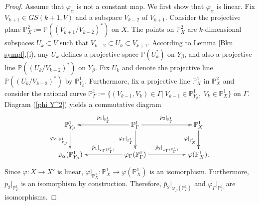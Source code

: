 \documentclass[12pt]{amsart}
\renewcommand{\phi}{\varphi}
\theoremstyle{definition}
\begin{document}
\begin{proof}
Assume that $\phi_{\alpha}$ is not a constant map. We first show that $\phi_{\alpha}$ is linear.
Fix $V_{k+1}\in GS(k+1,V)$ and a subspace $V_{k-2}$ of $V_{k+1}$.
Consider the
projective plane $\mathbb{P}^2_X:=\mathbb{P}((V_{k+1}/V_{k-2})^*)$ on $X$.
The points on $\mathbb{P}^2_X$ are $k$-dimensional subspaces
$U_k\subset V$ such that $V_{k-2}\subset U_k\subset V_{k+1}$.
According to Lemma \ref{Bkn sympl},(i), any $U_k$ defines a projective space $\mathbb{P}(U_k^*)$ on $Y_{\beta}$,
and also a projective line
$\mathbb{P}((U_k/V_{k-2})^*)$ on $Y_{\beta}$.
Fix $U_k$ and denote the projective line $\mathbb{P}((U_k/V_{k-2})^*)$ by $\mathbb{P}^1_{Y_{\beta}}$.
Furthermore, fix a projective line $\mathbb{P}^1_X$ in $\mathbb{P}^2_X$
and consider the rational curve $\mathbb{P}^1_{\Gamma}:=
\{(V_{k-1},V_k)\in\Gamma|\ V_{k-1}\in\mathbb{P}^1_{Y_{\beta}},\ V_k\in \mathbb{P}^1_X\}$ on $\Gamma$.
Diagram (\ref{phi Y^2}) yields a commutative diagram
\begin{equation}\label{curves}
\xymatrix{
\mathbb{P}^1_{Y_{\beta}}\ar[d]_-{\phi_{\alpha}|_{\mathbb{P}^1_{Y_{\beta}}}} &&
\mathbb{P}^1_{\Gamma}\ar[rr]^-{p_2|_{\mathbb{P}^1_{\Gamma}}}
\ar[d]_{\phi_{\Gamma}|_{\mathbb{P}^1_{\Gamma}}}\ar[ll]_-{p_1|_{\mathbb{P}^1_{\Gamma}}} &&
\mathbb{P}^1_X\ar[d]_{\phi|_{\mathbb{P}^1_X}}  \\
\phi_{\alpha}(\mathbb{P}^1_{Y_{\beta}}) &&
\phi_{\Gamma}(\mathbb{P}^1_{\Gamma})\ar[rr]^-{\bar{p}_2|_{\phi_{\Gamma}(\mathbb{P}^1_{\Gamma})}}
\ar[ll]_-{\bar{p}_1|_{\phi_{\Gamma}(\mathbb{P}^1_{\Gamma})}} && \phi(\mathbb{P}^1_X).}
\end{equation}
Since $\phi:X\to X'$ is linear, $\phi|_{\mathbb{P}^1_X}:\mathbb{P}^1_X\to \phi(\mathbb{P}^1_X)$ is an isomorphism.
Furthermore, $p_2|_{\mathbb{P}^1_{\Gamma}}$ is an isomorphism by construction. Therefore,
$\bar{p}_2|_{\phi_{\Gamma}(\mathbb{P}^1_{\Gamma})}$ and $\phi_{\Gamma}|_{\mathbb{P}^1_{\Gamma}}$ are isomorphisms.


\end{proof}
\end{document}

